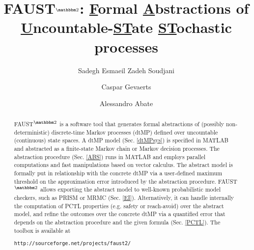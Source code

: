 \documentclass{llncs}
\newcommand{\software}{\textsf{FAUST}$^{\mathbbm 2}$\xspace}
\begin{document}
\title{\software: \underline{F}ormal \underline{A}bstractions of \underline{U}ncountable-\underline{ST}ate \underline{ST}ochastic processes}
\author{Sadegh Esmaeil Zadeh Soudjani 
\and Caspar Gevaerts
\and Alessandro Abate
}

\maketitle

\begin{abstract}
\software  is a software tool that generates formal abstractions of (possibly non-deterministic) discrete-time Markov processes (dtMP) defined over uncountable (continuous) state spaces. 
A dtMP model (Sec. \ref{dtMPsys}) is specified in MATLAB  
and abstracted as a finite-state Markov chain or Markov decision processes.
The abstraction procedure (Sec. \ref{ABS}) runs in MATLAB and employs parallel computations and fast manipulations based on vector calculus.
The abstract model is formally put in relationship with the concrete dtMP via a user-defined maximum threshold on the approximation error introduced by the abstraction procedure.
\software  allows exporting the abstract model to well-known probabilistic model checkers, such as PRISM or MRMC (Sec. \ref{EI}).
Alternatively, it can handle internally the computation of PCTL properties (e.g. safety or reach-avoid) over the abstract model, and refine the outcomes over the concrete dtMP via a quantified error that depends on the abstraction procedure and the given formula (Sec. \ref{PCTL}). 
The toolbox is available at
\vspace{-0.2cm}
\begin{center}
{\small\texttt{http://sourceforge.net/projects/faust2/}}
\end{center}
\end{abstract}
\end{document}
